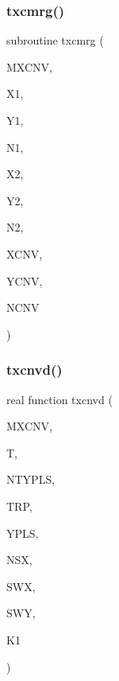 \subsubsection{\texorpdfstring{txcmrg()}{txcmrg()}}
{\footnotesize\ttfamily subroutine txcmrg (\begin{DoxyParamCaption}\item[{integer, intent(in)}]{M\+X\+C\+NV,  }\item[{real, dimension(mxcnv), intent(in)}]{X1,  }\item[{real, dimension(mxcnv), intent(in)}]{Y1,  }\item[{integer, intent(in)}]{N1,  }\item[{real, dimension(mxcnv), intent(in)}]{X2,  }\item[{real, dimension(mxcnv), intent(in)}]{Y2,  }\item[{integer, intent(in)}]{N2,  }\item[{real, dimension(mxcnv), intent(out)}]{X\+C\+NV,  }\item[{real, dimension(4,mxcnv), intent(out)}]{Y\+C\+NV,  }\item[{integer, intent(out)}]{N\+C\+NV }\end{DoxyParamCaption})}

\mbox{\label{Leroi__c_8f90_a1cdfcb6ee629073412c28d9cf0215636}} 
\subsubsection{\texorpdfstring{txcnvd()}{txcnvd()}}
{\footnotesize\ttfamily real function txcnvd (\begin{DoxyParamCaption}\item[{integer, intent(in)}]{M\+X\+C\+NV,  }\item[{real, intent(in)}]{T,  }\item[{integer, intent(in)}]{N\+T\+Y\+P\+LS,  }\item[{real, dimension(ntypls), intent(in)}]{T\+RP,  }\item[{real, dimension(4,ntypls), intent(in)}]{Y\+P\+LS,  }\item[{integer, intent(in)}]{N\+SX,  }\item[{real, dimension(nsx), intent(in)}]{S\+WX,  }\item[{real, dimension(nsx,3), intent(in)}]{S\+WY,  }\item[{integer}]{K1 }\end{DoxyParamCaption})}


